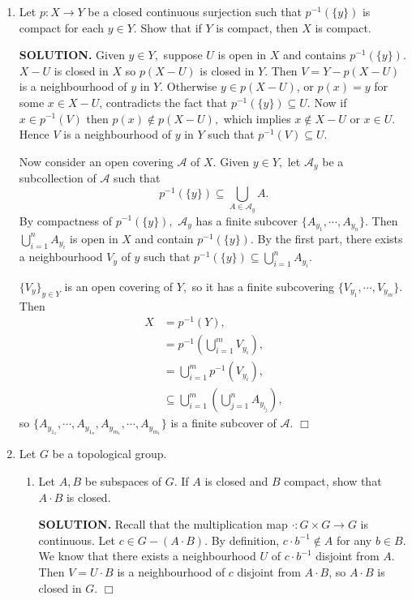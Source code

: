 \documentclass{article}
\begin{document}
\begin{enumerate}
    \item Let $p: X \rightarrow Y$ be a closed continuous surjection such that $p^{-1}(\{y\})$ is compact for each $y \in Y.$ Show that if $Y$ is compact, then $X$ is compact.

    {\bf SOLUTION.} Given $y \in Y,$ suppose $U$ is open in $X$ and contains $p^{-1}(\{y\})$. $X-U$ is closed in $X$ so $p(X-U)$ is closed in $Y.$ Then $V = Y - p(X-U)$ is a neighbourhood of $y$ in $Y.$ Otherwise $y \in p(X-U)$, or $p(x) = y$ for some $x \in X-U$, contradicts the fact that $p^{-1}(\{y\}) \subseteq U.$ Now if $x \in p^{-1}(V)$ then $p(x) \notin p(X-U),$ which implies $x \notin X-U$ or $x \in U.$ Hence $V$ is a neighbourhood of $y$ in $Y$ such that $p^{-1}(V) \subseteq U.$

    Now consider an open covering $\mathcal{A}$ of $X.$ Given $y \in Y,$ let $\mathcal{A}_y$ be a subcollection of $\mathcal{A}$ such that
    $$p^{-1}(\{y\}) \subseteq \bigcup_{A \in \mathcal{A}_y} A.$$
    By compactness of $p^{-1}(\{y\}),$ $\mathcal{A}_y$ has a finite subcover $\{A_{y_1}, \cdots, A_{y_n}\}.$ Then $\bigcup_{i=1}^{n} A_{y_i}$ is open in $X$ and contain $p^{-1}(\{y\}).$ By the first part, there exists a neighbourhood $V_y$ of $y$ such that $p^{-1}(\{y\}) \subseteq \bigcup_{i=1}^{n} A_{y_i}.$

    $\{V_y\}_{y \in Y}$ is an open covering of $Y,$ so it has a finite subcovering $\{V_{y_1}, \cdots, V_{y_m}\}.$ Then
    \begin{align*}
        X &= p^{-1}(Y), \\
        &= p^{-1}\left( \bigcup_{i=1}^m V_{y_i} \right), \\
        &= \bigcup_{i=1}^m p^{-1}(V_{y_i}), \\
        &\subseteq \bigcup_{i=1}^m \left( \bigcup_{j=1}^n A_{y_{i_j}} \right),
    \end{align*}
    so $\{A_{y_{1_1}}, \cdots, A_{y_{1_n}}, A_{y_{m_1}}, \cdots, A_{y_{m_1}}\}$ is a finite subcover of $\mathcal{A}.$ $\Box$

    \item Let $G$ be a topological group.
    \begin{enumerate}
        \item Let $A, B$ be subspaces of $G.$ If $A$ is closed and $B$ compact, show that $A \cdot B$ is closed.

        {\bf SOLUTION.} Recall that the multiplication map $\cdot: G \times G \rightarrow G$ is continuous. Let $c \in G - (A \cdot B).$ By definition, $c \cdot b^{-1} \notin A$ for any $b \in B.$ We know that there exists a neighbourhood $U$ of $c \cdot b^{-1}$ disjoint from $A.$ Then $V = U \cdot B$ is a neighbourhood of $c$ disjoint from $A \cdot B$, so $A \cdot B$ is closed in $G$. $\Box$


\end{enumerate}
\end{enumerate}
\end{document}
